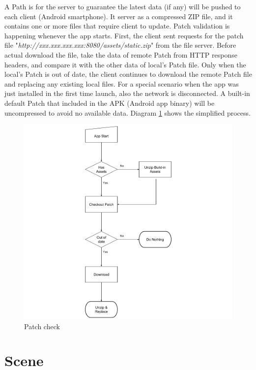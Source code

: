 A Path is for the server to guarantee the latest data (if any) will be pushed to each client (Android smartphone). It server as a compressed ZIP file, and it contains one or more files that require client to update. Patch validation is happening whenever the app starts. First, the client sent requests for the patch file "\emph{http://xxx.xxx.xxx.xxx:8080/assets/static.zip}" from the file server. Before actual download the file, take the  data of remote Patch from HTTP response headers, and compare it with the other  data of local's Patch file. Only when the local's Patch is out of date, the client continues to download the remote Patch file and replacing any existing local files. For a special scenario when the app was just installed in the first time launch, also the network is disconnected. A built-in default Patch that included in the APK (Android app binary) will be uncompressed to avoid no available data. Diagram \ref{fig:patch-check} shows the simplified process.

\begin{figure}[H]
\caption{Patch check}
\label{fig:patch-check}
\centering
\includegraphics[width=\linewidth]{Figures/patch-check.png}
\decoRule
\end{figure}

\section{Scene}
\label{section:scene}

